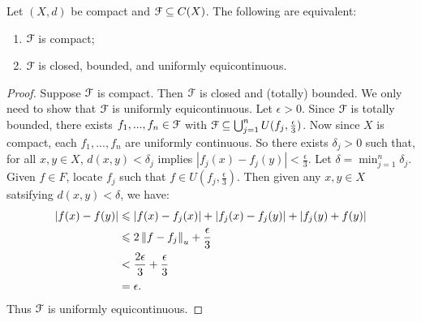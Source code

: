     \begin{theorem}
        Let $(X,d)$ be compact and $\mathcal{F} \subseteq C(X)$. The following are equivalent:
            \begin{enumerate}[label = (\arabic*),itemsep=1pt,topsep=3pt]
                \item $\mathcal{F}$ is compact;
                \item $\mathcal{F}$ is closed, bounded, and uniformly equicontinuous.
            \end{enumerate}
    \end{theorem}
        \begin{proof}
            Suppose $\mathcal{F}$ is compact. Then $\mathcal{F}$ is closed and (totally) bounded. We only need to show that $\mathcal{F}$ is uniformly equicontinuous. Let $\epsilon > 0$. Since $\mathcal{F}$ is totally bounded, there exists $f_1,...,f_n \in \mathcal{F}$ with $\mathcal{F} \subseteq \bigcup_{j = 1}^n U(f_j, \frac{\epsilon}{3})$. Now since $X$ is compact, each $f_1,...,f_n$ are uniformly continuous.  So there exists $\delta_j > 0$ such that, for all $x,y \in X$, $d(x,y) < \delta_j$ implies $|f_j(x) - f_j(y)| < \frac{\epsilon}{3}$. Let $\delta = \min_{j = 1}^n \delta_j$. Given $f \in F$, locate $f_j$ such that $f \in U(f_j, \frac{\epsilon}{3})$. Then given any $x,y \in X$ satsifying $d(x,y) < \delta$, we have:
                \begin{equation*}
                \begin{split}
                    |f(x) - f(y)|
                    & \leqslant |f(x) - f_j(x)| + |f_j(x) - f_j(y)| + |f_j(y) + f(y)| \\
                    & \leqslant 2 \left\lVert f - f_j \right\rVert_u + \frac{\epsilon}{3} \\
                    & < \frac{2\epsilon}{3} + \frac{\epsilon}{3} \\
                    & = \epsilon.
                \end{split}
                \end{equation*}
            Thus $\mathcal{F}$ is uniformly equicontinuous.


\end{proof}
